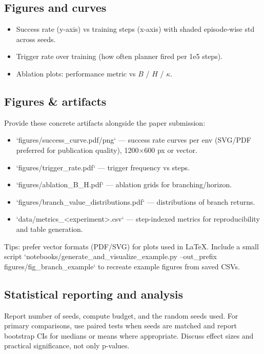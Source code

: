\documentclass{article}
\begin{document}
\subsection{Figures and curves}
\begin{itemize}
\item Success rate (y-axis) vs training steps (x-axis) with shaded episode-wise std across seeds.
\item Trigger rate over training (how often planner fired per 1e5 steps).
\item Ablation plots: performance metric vs \(B\) / \(H\) / \(\kappa\).
\end{itemize}

\subsection{Figures & artifacts}
Provide these concrete artifacts alongside the paper submission:
\begin{itemize}
\item `figures/success_curve.pdf/png` — success rate curves per env (SVG/PDF preferred for publication quality), 1200×600 px or vector.
\item `figures/trigger_rate.pdf` — trigger frequency vs steps.
\item `figures/ablation_B_H.pdf` — ablation grids for branching/horizon.
\item `figures/branch_value_distributions.pdf` — distributions of branch returns.
\item `data/metrics_<experiment>.csv` — step-indexed metrics for reproducibility and table generation.
\end{itemize}

Tips: prefer vector formats (PDF/SVG) for plots used in LaTeX. Include a small script `notebooks/generate_and_visualize_example.py --out_prefix figures/fig_branch_example` to recreate example figures from saved CSVs.

\subsection{Statistical reporting and analysis}
Report number of seeds, compute budget, and the random seeds used. For primary
comparisons, use paired tests when seeds are matched and report bootstrap CIs
for medians or means where appropriate. Discuss effect sizes and practical
significance, not only p-values.
\end{document}
